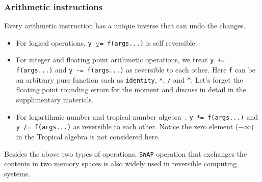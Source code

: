 \documentclass{article}
\newcommand{\<}{\langle}
\renewcommand{\>}{\rangle}
\theoremstyle{definition}\newtheorem{definition}{\textit{Definition}}
\begin{document}
\subsubsection{Arithmetic instructions}
Every arithmetic instruction has a unique inverse that can undo the changes.
\begin{itemize}
    \item For logical operations, \texttt{y $\veebar$= f(args...)} is self reversible.
    \item For integer and floating point arithmetic operations, we treat \texttt{y += f(args...)} and \texttt{y -= f(args...)} as reversible to each other. Here \texttt{f} can be an arbitrary pure function such as \texttt{identity}, \texttt{*}, \texttt{/} and \texttt{\^}. Let's forget the floating point rounding errors for the moment and discuss in detail in the supplimentary materials.
    \item For logartihmic number and tropical number algebra~\cite{Speyer2009}, \texttt{y *= f(args...)} and \texttt{y /= f(args...)} as reversible to each other. Notice the zero element ($-\infty$) in the Tropical algebra is not considered here.
\end{itemize}
Besides the above two types of operations, \texttt{SWAP} operation that exchanges the contents in two memory spaces is also widely used in reversible computing systems.

\end{document}
